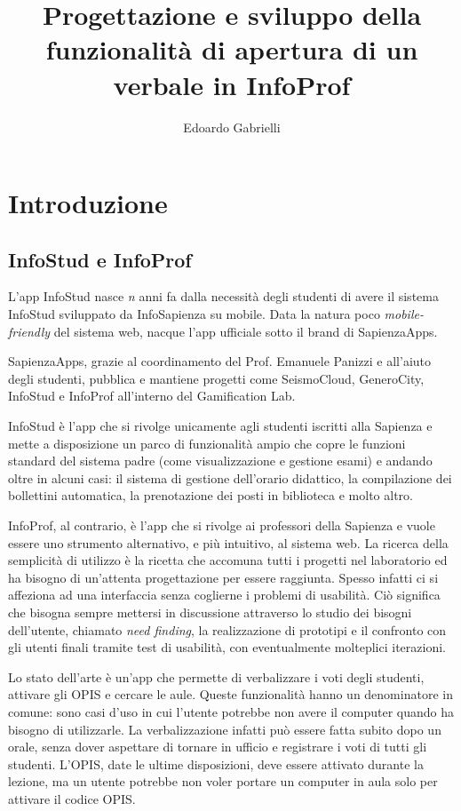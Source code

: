 \documentclass[Lau, oneside, noexaminfo]{sapthesis}%
\title{Progettazione e sviluppo della funzionalità di apertura di un verbale in InfoProf}
\author{Edoardo Gabrielli}
\begin{document}
\frontmatter
\maketitle

\tableofcontents

\mainmatter
\chapter{Introduzione}
\label{ch:1}

\section{InfoStud e InfoProf}
\label{sec:pres}
L'app InfoStud nasce \textit{n} anni fa dalla necessità degli studenti di avere il sistema InfoStud sviluppato da InfoSapienza su mobile.
Data la natura poco \textit{mobile-friendly} del sistema web, nacque l'app ufficiale sotto il brand di SapienzaApps.

SapienzaApps, grazie al coordinamento del Prof. Emanuele Panizzi e all'aiuto degli studenti, pubblica e mantiene progetti come SeismoCloud, GeneroCity, InfoStud e InfoProf all'interno del Gamification Lab.

InfoStud è l'app che si rivolge unicamente agli studenti iscritti alla Sapienza e mette a disposizione un parco di funzionalità ampio che copre le funzioni standard del sistema padre (come visualizzazione e gestione esami) e andando oltre in alcuni casi: il sistema di gestione dell'orario didattico, la compilazione dei bollettini automatica, la prenotazione dei posti in biblioteca e molto altro.

InfoProf, al contrario, è l'app che si rivolge ai professori della Sapienza e vuole essere uno strumento alternativo, e più intuitivo, al sistema web. La ricerca della semplicità di utilizzo è la ricetta che accomuna tutti i progetti nel laboratorio ed ha bisogno di un'attenta progettazione per essere raggiunta. Spesso infatti ci si affeziona ad una interfaccia senza coglierne i problemi di usabilità. Ciò significa che bisogna sempre mettersi in discussione attraverso lo studio dei bisogni dell'utente, chiamato \textit{need finding}, la realizzazione di prototipi e il confronto con gli utenti finali tramite test di usabilità, con eventualmente molteplici iterazioni.

Lo stato dell'arte è un'app che permette di verbalizzare i voti degli studenti, attivare gli OPIS e cercare le aule. Queste funzionalità hanno un denominatore in comune: sono casi d'uso in cui l'utente potrebbe non avere il computer quando ha bisogno di utilizzarle. La verbalizzazione infatti può essere fatta subito dopo un orale, senza dover aspettare di tornare in ufficio e registrare i voti di tutti gli studenti. L'OPIS, date le ultime disposizioni, deve essere attivato durante la lezione, ma un utente potrebbe non voler portare un computer in aula solo per attivare il codice OPIS.
\end{document}
